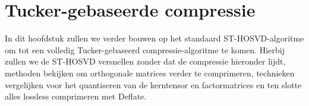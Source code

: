 \chapter{Tucker-gebaseerde compressie}
\label{hoofdstuk:tucker}

In dit hoofdstuk zullen we verder bouwen op het standaard ST-HOSVD-algoritme om tot een volledig Tucker-gebaseerd compressie-algoritme te komen. Hierbij zullen we de ST-HOSVD versnellen zonder dat de compressie hieronder lijdt, methoden bekijken om orthogonale matrices verder te comprimeren, technieken vergelijken voor het quantiseren van de kerntensor en factormatrices en ten slotte alles lossless comprimeren met Deflate.






